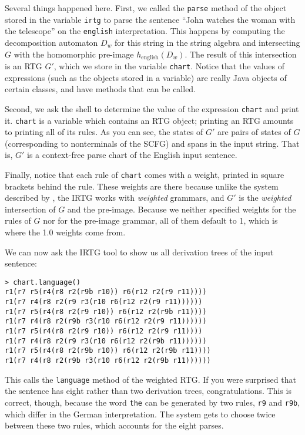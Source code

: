 \documentclass[11pt]{article}
\begin{document}
Several things happened here. First, we called the \verb?parse? method
of the object stored in the variable \verb?irtg? to parse the sentence
``John watches the woman with the telescope'' on the \verb?english?
interpretation. This happens by computing the decomposition automaton
$D_w$ for this string in the string algebra and intersecting $G$ with
the homomorphic pre-image $h_\mathrm{english}(D_w)$. The result of
this intersection is an RTG $G'$, which we store in the variable
\verb?chart?. Notice that the values of expressions (such as the
objects stored in a variable) are really Java objects of certain
classes, and have methods that can be called.

Second, we ask the shell to determine the value of the expression
\verb?chart? and print it. \verb?chart? is a variable which contains
an RTG object; printing an RTG amounts to printing all of its rules.
As you can see, the states of $G'$ are pairs of states of $G$
(corresponding to nonterminals of the SCFG) and spans in the input
string. That is, $G'$ is a context-free parse chart of the English
input sentence.

Finally, notice that each rule of \verb?chart? comes with a weight,
printed in square brackets behind the rule. These weights are there
because unlike the system described by \cite{koller11}, the IRTG works
with \emph{weighted} grammars, and $G'$ is the \emph{weighted}
intersection of $G$ and the pre-image. Because we neither specified
weights for the rules of $G$ nor for the pre-image grammar, all of
them default to 1, which is where the 1.0 weights come from.

We can now ask the IRTG tool to show us all derivation trees of the
input sentence:

\begin{verbatim}
> chart.language()
r1(r7 r5(r4(r8 r2(r9b r10)) r6(r12 r2(r9 r11))))
r1(r7 r4(r8 r2(r9 r3(r10 r6(r12 r2(r9 r11))))))
r1(r7 r5(r4(r8 r2(r9 r10)) r6(r12 r2(r9b r11))))
r1(r7 r4(r8 r2(r9b r3(r10 r6(r12 r2(r9 r11))))))
r1(r7 r5(r4(r8 r2(r9 r10)) r6(r12 r2(r9 r11))))
r1(r7 r4(r8 r2(r9 r3(r10 r6(r12 r2(r9b r11))))))
r1(r7 r5(r4(r8 r2(r9b r10)) r6(r12 r2(r9b r11))))
r1(r7 r4(r8 r2(r9b r3(r10 r6(r12 r2(r9b r11))))))
\end{verbatim}

This calls the \verb?language? method of the weighted RTG. If you
were surprised that the sentence has eight rather than two derivation
trees, congratulations. This is correct, though, because the word
\verb?the? can be generated by two rules, \verb?r9? and \verb?r9b?,
which differ in the German interpretation. The system gets to choose
twice between these two rules, which accounts for the eight parses.
\end{document}
